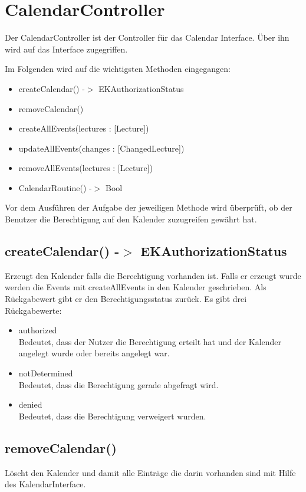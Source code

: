 \section{CalendarController}
Der CalendarController ist der Controller für das Calendar Interface. Über ihn wird auf das Interface zugegriffen.

Im Folgenden wird auf die wichtigsten Methoden eingegangen:
\begin{itemize}
     \item createCalendar() -$>$ EKAuthorizationStatus
     \item removeCalendar()
     \item createAllEvents(lectures : [Lecture])
     \item updateAllEvents(changes : [ChangedLecture])
     \item removeAllEvents(lectures : [Lecture])
     \item CalendarRoutine() -$>$ Bool
\end{itemize}

Vor dem Ausführen der Aufgabe der jeweiligen Methode wird überprüft, ob der Benutzer die Berechtigung auf den Kalender zuzugreifen gewährt hat.

\subsection[createCalendar]{createCalendar() -$>$ EKAuthorizationStatus}
Erzeugt den Kalender falls die Berechtigung vorhanden ist. Falls er erzeugt wurde werden die Events mit createAllEvents in den Kalender geschrieben. Als Rückgabewert gibt er den Berechtigungsstatus zurück. Es gibt drei Rückgabewerte:
\begin{itemize}
     \item authorized \\[0.5em]
     Bedeutet, dass der Nutzer die Berechtigung erteilt hat und der Kalender angelegt wurde oder bereits angelegt war.
     \item notDetermined \\[0.5em]
     Bedeutet, dass die Berechtigung gerade abgefragt wird.
     \item denied \\[0.5em]
     Bedeutet, dass die Berechtigung verweigert wurden.
\end{itemize}

\subsection[removeCalendar]{removeCalendar()}
Löscht den Kalender und damit alle Einträge die darin vorhanden sind mit Hilfe des KalendarInterface.

